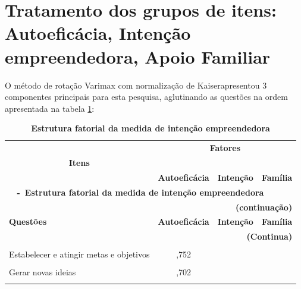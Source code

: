 \section{Tratamento dos grupos de itens: Autoeficácia, Intenção empreendedora, Apoio Familiar}

O método de rotação Varimax com normalização de Kaiser\footnotemark[1] apresentou 3 componentes principais para esta pesquisa, aglutinando as questões na ordem apresentada na tabela \ref{tabela_3}:


\begin{longtable}[!h]{p{6cm} c c c }
\caption{\textbf{Estrutura fatorial da medida de intenção empreendedora}}
\label{tabela_3}\\
\hline \hline


\multicolumn{1}{p{6cm}}{} & \multicolumn{3}{c}{\textbf{Fatores}}\\ 
 \multicolumn{1}{c}{\textbf{Itens}} & \multicolumn{3}{c}{\hrulefill}\\ 

 \multicolumn{1}{c}{} 
 &\multicolumn{1}{p{1.5cm}}{\textbf{Autoeficácia}} & \multicolumn{1}{p{1.5cm}}{\textbf{Intenção}} &\multicolumn{1}{p{1.5cm}}{\textbf{Família}}  
\\ \hline 

\endfirsthead


\multicolumn{4}{l}{{{\bfseries \tablename \ \thetable{} -\ \textbf{Estrutura fatorial da medida de intenção empreendedora}}}}\\
\multicolumn{4}{r}{\bfseries \textbf{(continuação)}}\\

\hline \multicolumn{1}{p{6cm}}{\textbf{Questões}} &\multicolumn{1}{c}{\textbf{Autoeficácia}} & \multicolumn{1}{c}{\textbf{Intenção}} &\multicolumn{1}{c}{\textbf{Família}}  
\\ \hline 

\endhead

\hline \multicolumn{4}{r}{\textbf{(Continua)}} \\ \hline


\endfoot
\hline \multicolumn{4}{r}{\textbf{(Conclusão)}} \\ \hline
\hline \hline

\endlastfoot


Estabelecer e atingir metas e objetivos
 &  ,752 & & \\\\
 
Gerar novas ideias
 &  ,702 & & \\\\
 

\end{longtable}
